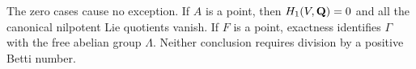 \begin{remark}
The zero cases cause no exception. If $A$ is a point, then
$H_1(V,\mathbf Q)=0$ and all the canonical nilpotent Lie quotients vanish. If
$F$ is a point, exactness identifies $\Gamma$ with the free abelian
group $\Lambda$. Neither conclusion requires division by a positive
Betti number.
\end{remark}
